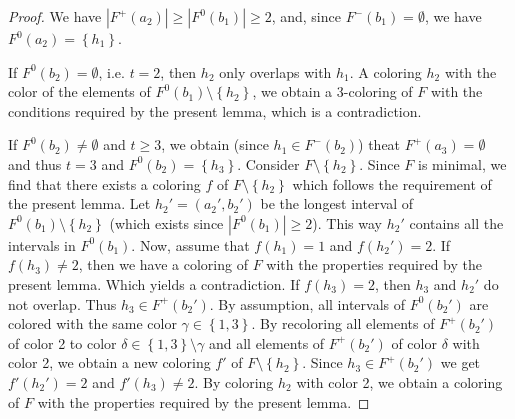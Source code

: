 \documentclass[12pt]{article}
\theoremstyle{definition}
\begin{document}
\begin{proof}
        We have $\left|F^{+}\left(a_{2}\right)\right| \geq
        \left|F^{0}\left(b_1\right)\right| \geq 2$,
        and, since $F^{-}\left(b_1\right) = \emptyset$,
        we have $F^{0}\left(a_2\right)
        = \left\{h_1\right\}$.
        
        If $F^{0}\left(b_2\right) = \emptyset$,
        i.e. $t=2$, then $h_2$
        only overlaps with $h_1$.
        A coloring $h_2$ with the color
        of the elements of $F^{0}\left(b_1\right)
        \setminus \left\{h_2\right\}$,
        we obtain a 3-coloring of $F$ with
        the conditions required by
        the present lemma, which is a
        contradiction.
        
        If $F^{0}\left(b_2\right) \neq \emptyset$
        and $t \geq 3$,
        we obtain (since $h_1 \in
        F^{-}\left(b_2\right)$)
        theat $F^{+}\left(a_3\right)=\emptyset$ 
        and thus $t=3$
        and $F^{0}\left(b_2\right) = \left\{h_3\right\}$.
        Consider $F \setminus \left\{h_2\right\}$.
        Since $F$ is minimal,
        we find that there exists
        a coloring $f$ of $F \setminus \left\{h_2\right\}$
        which follows the requirement
        of the present lemma.
        Let $h_2' = \left(a_2', b_2'\right)$
        be the longest interval of 
        $F^{0}\left(b_1\right) \setminus \left\{h_2\right\}$
        (which exists since $\left|F^{0}\left(b_1\right)\right|
        \geq 2$). This way
        $h_2'$ contains all
        the intervals in
        $F^{0}\left(b_1\right)$.
        Now, assume that $f\left(h_1\right) = 1$
        and $f\left(h_2'\right) = 2$.
        If $f\left(h_3\right)\neq 2$,
        then we have a coloring 
        of $F$ with the properties
        required by the present lemma.
        Which yields a contradiction.
        If $f\left(h_3\right) = 2$,
        then $h_3$ and $h_2'$
        do not overlap. Thus $h_3 \in F^{+}\left(b_2'\right)$.
        By assumption, all intervals
        of $F^{0}\left(b_2'\right)$ 
        are colored with the same color
        $\gamma \in \left\{1,3\right\}$.
        By recoloring all elements
        of $F^{+}\left(b_2'\right)$
        of color 2 to color 
        $\delta \in \left\{1,3\right\}
        \setminus \gamma$
        and all elements of $F^{+}\left(b_2'\right)$ 
        of color $\delta$ with color 2,
        we obtain a 
        new coloring $f'$ of 
        $F \setminus \left\{h_2\right\}$.
        Since $h_3 \in F^{+}\left(b_2'\right)$
        we get
        $f'\left(h_2'\right)=2$ and
        $f'\left(h_3\right) \neq 2$.
        By coloring $h_2$ with
        color 2, 
        we obtain a coloring
        of $F$ with the properties
        required by the present lemma.
    \end{proof}
    
\end{document}

